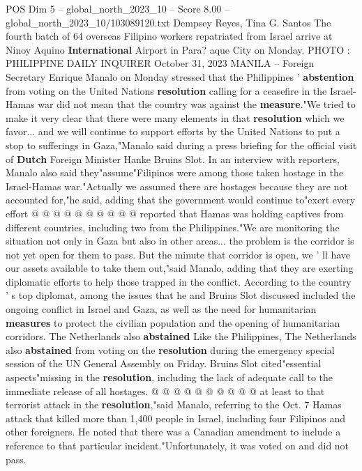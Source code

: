 \begin{textsample}{POS Dim 5 – global\_north\_2023\_10 – Score 8.00 – global\_north\_2023\_10/103089120.txt}  \label{ex:f5_pos_435}
Dempsey Reyes, Tina G.
Santos The fourth batch of 64 overseas Filipino workers repatriated from Israel arrive at Ninoy Aquino \textbf{International} Airport in Para? aque City on Monday.
PHOTO : PHILIPPINE DAILY INQUIRER October 31, 2023 MANILA -- Foreign Secretary Enrique Manalo on Monday stressed that the Philippines ' \textbf{abstention} from voting on the United Nations \textbf{resolution} calling for a ceasefire in the Israel-Hamas war did not mean that the country was against the \textbf{measure}."We tried to make it very clear that there were many elements in that \textbf{resolution} which we favor... and we will continue to support efforts by the United Nations to put a stop to sufferings in Gaza,"Manalo said during a press briefing for the official visit of \textbf{Dutch} Foreign Minister Hanke Bruins Slot.
In an interview with reporters, Manalo also said they"assume"Filipinos were among those taken hostage in the Israel-Hamas war."Actually we assumed there are hostages because they are not accounted for,"he said, adding that the government would continue to"exert every effort @ @ @ @ @ @ @ @ @ @ reported that Hamas was holding captives from different countries, including two from the Philippines."We are monitoring the situation not only in Gaza but also in other areas... the problem is the corridor is not yet open for them to pass.
But the minute that corridor is open, we ' ll have our assets available to take them out,"said Manalo, adding that they are exerting diplomatic efforts to help those trapped in the conflict.
According to the country ' s top diplomat, among the issues that he and Bruins Slot discussed included the ongoing conflict in Israel and Gaza, as well as the need for humanitarian \textbf{measures} to protect the civilian population and the opening of humanitarian corridors.
The Netherlands also \textbf{abstained} Like the Philippines, The Netherlands also \textbf{abstained} from voting on the \textbf{resolution} during the emergency special session of the UN General Assembly on Friday.
Bruins Slot cited"essential aspects"missing in the \textbf{resolution}, including the lack of adequate call to the immediate release of all hostages. @ @ @ @ @ @ @ @ @ @ at least to that terrorist attack in the \textbf{resolution},"said Manalo, referring to the Oct. 7 Hamas attack that killed more than 1,400 people in Israel, including four Filipinos and other foreigners.
He noted that there was a Canadian amendment to include a reference to that particular incident."Unfortunately, it was voted on and did not pass.

\end{textsample}
